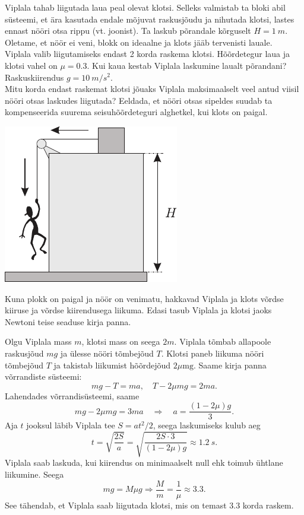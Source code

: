 
Viplala tahab liigutada laua peal olevat klotsi. Selleks valmistab ta bloki abil süsteemi, et ära kasutada endale mõjuvat raskusjõudu ja nihutada klotsi, lastes ennast nööri otsa rippu (vt. joonist). Ta laskub põrandale kõrguselt $H=\SI{1}{m} .$ Oletame, et nöör ei veni, blokk on ideaalne ja klots jääb tervenisti lauale.\\
\osa Viplala valib liigutamiseks endast 2 korda raskema klotsi. Hõõrdetegur laua ja klotsi vahel on $\mu=\num{0,3}$. Kui kaua kestab Viplala laskumine laualt põrandani? Raskuskiirendus $g=\SI{10}{m/s^2}$.\\
\osa Mitu korda endast raskemat klotsi jõuaks Viplala maksimaalselt veel antud viisil nööri otsas laskudes liigutada? Eeldada, et nööri otsas sipeldes suudab ta kompenseerida suurema seisuhõõrdeteguri alghetkel, kui klots on paigal.
\begin{center}
	\includegraphics[width=0.4\linewidth]{2004-lahg-01-yl.pdf}
\end{center}

\hint
Kuna plokk on paigal ja nöör on venimatu, hakkavad Viplala ja klots võrdse kiiruse ja võrdse kiirendusega liikuma. Edasi tasub Viplala ja klotsi jaoks Newtoni teise seaduse kirja panna.

\solu
Olgu Viplala mass $m$, klotsi mass on seega $2 m$. Viplala tõmbab allapoole raskusjõud $m g$ ja ülesse nööri tõmbejõud $T$. Klotsi paneb liikuma nööri tõmbejõud $T$ ja takistab liikumist hõõrdejõud $2 \mu \mathrm{mg} .$ Saame kirja panna võrrandiste süsteemi:
$$
m g-T=m a, \quad T-2 \mu m g=2 m a.
$$
Lahendades võrrandisüsteemi, saame
$$
m g-2 \mu m g=3 m a \quad \Rightarrow \quad a=\frac{(1-2 \mu) g}{3}.
$$
Aja $t$ jooksul läbib Viplala tee $S=a t^{2} / 2$, seega laskumiseks kulub aeg
$$
t=\sqrt{\frac{2 S}{a}}=\sqrt{\frac{2 S \cdot 3}{(1-2 \mu) g}} \approx \SI{1,2}{s}.
$$
Viplala saab laskuda, kui kiirendus on minimaalselt null ehk toimub ühtlane liikumine. Seega
$$
m g=M \mu g \Rightarrow \frac{M}{m}=\frac{1}{\mu} \approx \num{3,3}.
$$
See tähendab, et Viplala saab liigutada klotsi, mis on temast \num{3,3} korda raskem.

\probend